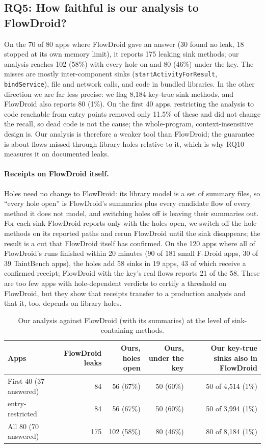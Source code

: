 \subsection{RQ5: How faithful is our analysis to FlowDroid?}
\label{sec:rq5}
On the 70 of 80 apps where FlowDroid gave an answer (30 found no leak, 18 stopped at its own memory limit), it reports 175 leaking sink methods; our analysis reaches 102 (58\%) with every hole on and 80 (46\%) under the key.
The misses are mostly inter-component sinks (\texttt{startActivityForResult}, \texttt{bindService}), file and network calls, and code in bundled libraries.
In the other direction we are far less precise: we flag 8{,}184 key-true sink methods, and FlowDroid also reports 80 (1\%).
On the first 40 apps, restricting the analysis to code reachable from entry points removed only 11.5\% of these and did not change the recall, so dead code is not the cause; the whole-program, context-insensitive design is.
Our analysis is therefore a weaker tool than FlowDroid; the guarantee is about flows missed through library holes relative to it, which is why RQ10 measures it on documented leaks.
\paragraph{Receipts on FlowDroid itself.}
Holes need no change to FlowDroid: its library model is a set of summary files, so ``every hole open'' is FlowDroid's summaries plus every candidate flow of every method it does not model, and switching holes off is leaving their summaries out.
For each sink FlowDroid reports only with the holes open, we switch off the hole methods on its reported paths and rerun FlowDroid until the sink disappears; the result is a cut that FlowDroid itself has confirmed.
On the 120 apps where all of FlowDroid's runs finished within 20 minutes (90 of 181 small F-Droid apps, 30 of 39 TaintBench apps), the holes add 58 sinks in 19 apps, 43 of which receive a confirmed receipt; FlowDroid with the key's real flows reports 21 of the 58.
These are too few apps with hole-dependent verdicts to certify a threshold on FlowDroid, but they show that receipts transfer to a production analysis and that it, too, depends on library holes.
\begin{table}[t]
\caption{Our analysis against FlowDroid (with its summaries) at the level of sink-containing methods.}
\label{tab:fd}
\small
\begin{tabular}{@{}lrrrr@{}}
\toprule
Apps & FlowDroid leaks & Ours, holes open & Ours, under the key & Our key-true sinks also in FlowDroid\\
\midrule
First 40 (37 answered) & 84 & 56 (67\%) & 50 (60\%) & 50 of 4{,}514 (1\%)\\
\quad entry-restricted & 84 & 56 (67\%) & 50 (60\%) & 50 of 3{,}994 (1\%)\\
All 80 (70 answered) & 175 & 102 (58\%) & 80 (46\%) & 80 of 8{,}184 (1\%)\\
\bottomrule
\end{tabular}
\end{table}

